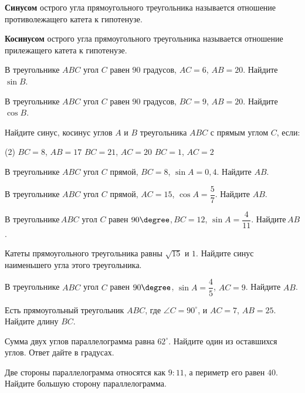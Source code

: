 \begin{class}[number=3]\begin{definit}
		\textbf{Синусом} острого угла прямоугольного треугольника называется отношение противолежащего катета к гипотенузе.
	\end{definit}
	\begin{definit}
		\textbf{Косинусом} острого угла прямоугольного треугольника называется отношение прилежащего катета к гипотенузе.
	\end{definit}
	\begin{listofex}
		\item В треугольнике \( ABC \) угол \( C \) равен \( 90 \) градусов, \( AC=6 \), \( AB=20 \). Найдите \( \sin B \).
		\item  В треугольнике \( ABC \) угол \( C \) равен \( 90 \) градусов, \( BC=9 \), \( AB=20 \). Найдите \( \cos B \).
		\item Найдите синус, косинус углов \( A \) и \( B \) треугольника \( ABC \) с прямым углом \( C \), если:
		\begin{tasks}(2)
			\task \( BC=8 \), \( AB=17 \)
			\task \( BC=21 \), \( AC=20 \)
			\task \( BC=1 \), \( AC=2 \)
		\end{tasks}
		
		\item В треугольнике \( ABC \) угол \( C \) прямой, \( BC=8 \), \( \sin A=0,4 \). Найдите \( AB \).
		\item В треугольнике \( ABC \) угол \( C \) прямой, \( AC=15 \), \( \cos A=\dfrac{5}{7} \). Найдите \( AB \).
		\item В треугольнике \( ABC \) угол \( C \) равен \( 90\degree \), \( BC=12 \), \( \sin A=\dfrac{4}{11} \). Найдите \( AB \).
		\item Катеты прямоугольного треугольника равны \( \sqrt{15} \) и \( 1 \). Найдите синус наименьшего угла этого треугольника.
		\item В треугольнике \( ABC \) угол \( C \) равен \( 90\degree \), \( \sin A=\dfrac{4}{5} \), \( AC=9 \). Найдите \( AB \).
		\item  Есть прямоугольный треугольник \( ABC \), где \( \angle C=90^{\circ} \), и \( AC=7 \), \( AB=25 \). Найдите длину \( BC \).
		\item Сумма двух углов параллелограмма равна \( 62^{\circ} \). Найдите один из оставшихся углов. Ответ дайте в градусах.
		\item Две стороны параллелограмма относятся как \( 9:11 \), а периметр его равен \( 40 \). Найдите большую сторону параллелограмма.
	\end{listofex}
\end{class}

